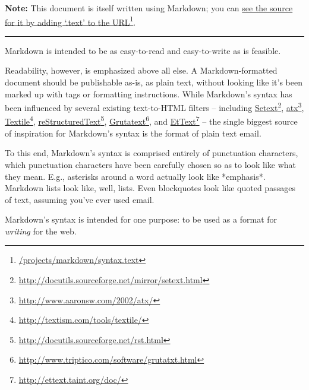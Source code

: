 \textbf{Note:} This document is itself written using Markdown; you
can \href{/projects/markdown/syntax.text}{see the source for it by adding `.text' to the URL}\footnote{\href{/projects/markdown/syntax.text}{\slash projects\slash markdown\slash syntax.text}}.

\begin{center}\rule{3in}{0.4pt}\end{center}

Markdown is intended to be as easy-to-read and easy-to-write as is feasible.

Readability, however, is emphasized above all else. A Markdown-formatted
document should be publishable as-is, as plain text, without looking
like it's been marked up with tags or formatting instructions. While
Markdown's syntax has been influenced by several existing text-to-HTML
filters -- including \href{http://docutils.sourceforge.net/mirror/setext.html}{Setext}\footnote{\href{http://docutils.sourceforge.net/mirror/setext.html}{http:\slash \slash docutils.sourceforge.net\slash mirror\slash setext.html}}, \href{http://www.aaronsw.com/2002/atx/}{atx}\footnote{\href{http://www.aaronsw.com/2002/atx/}{http:\slash \slash www.aaronsw.com\slash 2002\slash atx\slash }}, \href{http://textism.com/tools/textile/}{Textile}\footnote{\href{http://textism.com/tools/textile/}{http:\slash \slash textism.com\slash tools\slash textile\slash }}, \href{http://docutils.sourceforge.net/rst.html}{reStructuredText}\footnote{\href{http://docutils.sourceforge.net/rst.html}{http:\slash \slash docutils.sourceforge.net\slash rst.html}},
\href{http://www.triptico.com/software/grutatxt.html}{Grutatext}\footnote{\href{http://www.triptico.com/software/grutatxt.html}{http:\slash \slash www.triptico.com\slash software\slash grutatxt.html}}, and \href{http://ettext.taint.org/doc/}{EtText}\footnote{\href{http://ettext.taint.org/doc/}{http:\slash \slash ettext.taint.org\slash doc\slash }} -- the single biggest source of
inspiration for Markdown's syntax is the format of plain text email.

To this end, Markdown's syntax is comprised entirely of punctuation
characters, which punctuation characters have been carefully chosen so
as to look like what they mean. E.g., asterisks around a word actually
look like *emphasis*. Markdown lists look like, well, lists. Even
blockquotes look like quoted passages of text, assuming you've ever
used email.

Markdown's syntax is intended for one purpose: to be used as a
format for \emph{writing} for the web.

